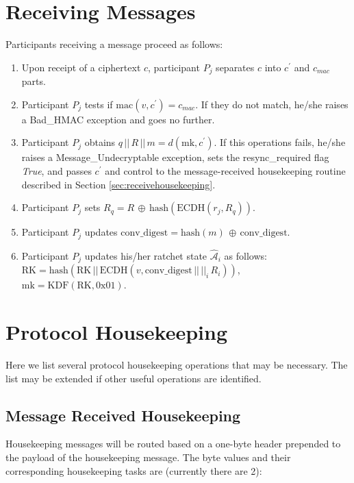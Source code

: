 \documentclass[%
preprint,
amsmath,amssymb,
aps,
prb,
floatfix,
]{revtex4-1}
\begin{document}
\section{\label{sec:receiving}Receiving Messages}
Participants receiving a message proceed as follows:
\begin{enumerate}
\item Upon receipt of a ciphertext $c$, participant $P_j$ separates $c$ into
$c^\prime$ and $c_{mac}$ parts.
\item Participant $P_j$ tests if $\mathrm{mac}(v, c^\prime) = c_{mac}$. If
they do not match, he/she raises a Bad\_HMAC exception and goes no further.
\item Participant $P_j$ obtains $q \, || \, R \, || \, m =
d(\mathrm{mk}, c^\prime)$.
If this operations fails, he/she raises a Message\_Undecryptable
exception, sets the resync\_required flag \textit{True},
and passes $c^\prime$ and control to the message-received housekeeping routine described in
Section \ref{sec:receivehousekeeping}.
\item Participant $P_j$ sets $R_q = R \, \oplus \,
\mathrm{hash}(\mathrm{ECDH}(r_j, R_q))$.
\item Participant $P_j$ updates $\mathrm{conv\_digest} = \mathrm{hash}(m) \, \oplus \, \mathrm{conv\_digest}$.
\item Participant $P_j$ updates his/her ratchet state $\mathcal{\hat{A}}_i$ as
follows: \\
$\mathrm{RK} = \mathrm{hash}(\mathrm{RK} \, || \, \mathrm{ECDH}(v,
\mathrm{conv\_digest} \, || \, ||_i \, R_i))$, \\
$\mathrm{mk} = \mathrm{KDF}(\mathrm{RK}, 0\mathrm{x}01)$.

\end{enumerate}

\section{\label{sec:housekeeping}Protocol Housekeeping}
Here we list several protocol housekeeping operations that may be necessary.
The list may be extended if other useful operations are identified.

\subsection{\label{sec:receivehousekeeping}Message Received Housekeeping}
Housekeeping messages will be routed based on a one-byte header prepended to the
payload of the housekeeping message. The byte values and their corresponding
housekeeping tasks are (currently there are 2): \\
\end{document}
